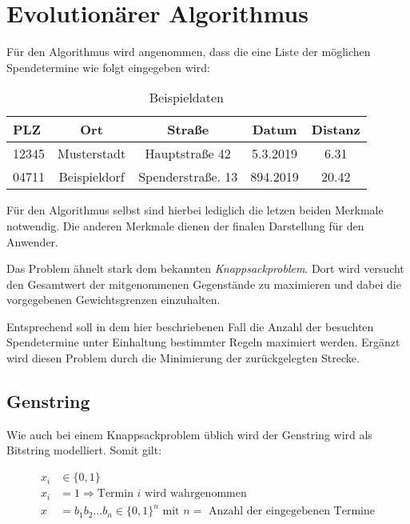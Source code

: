 \section{Evolutionärer Algorithmus}\label{sec:evol-alg}
Für den Algorithmus wird angenommen,
dass die eine Liste der möglichen Spendetermine wie folgt eingegeben wird:
\begin{table}[ht]
    \begin{center}
        \begin{tabular}{l|c|c|c|c}
            PLZ     & Ort               &  Straße               & Datum     & Distanz   \\
            \hline
            12345   & Musterstadt       & Hauptstraße 42        & 5.3.2019  & 6.31      \\
            04711   & Beispieldorf      & Spenderstraße. 13     & 894.2019  & 20.42     \\
        \end{tabular}
    \end{center}
    \caption{Beispieldaten}
\end{table}


Für den Algorithmus selbst sind hierbei lediglich die letzen beiden Merkmale notwendig.
Die anderen Merkmale dienen der finalen Darstellung für den Anwender.

Das Problem ähnelt stark dem bekannten \emph{Knappsackproblem}.
Dort wird versucht den Gesamtwert der mitgenommenen Gegenstände zu maximieren
und dabei die vorgegebenen Gewichtsgrenzen einzuhalten.

Entsprechend soll in dem hier beschriebenen Fall die Anzahl der besuchten Spendetermine unter
Einhaltung bestimmter Regeln maximiert werden.
Ergänzt wird diesen Problem durch die Minimierung der zurückgelegten Strecke.

\subsection{Genstring}
Wie auch bei einem Knappsackproblem üblich wird der Genstring wird als Bitstring modelliert.
Somit gilt:

\begin{equation}
    \label{eqn:genstring}
    \begin{split}
        x_i &\in \{ 0,1 \} \\
        x_i &= 1 \Rightarrow \text{Termin $i$ wird wahrgenommen} \\
        x   &= b_1b_2...b_n \in \{0,1\}^n\text{ mit $n = $ Anzahl der eingegebenen Termine}
    \end{split}
\end{equation}

